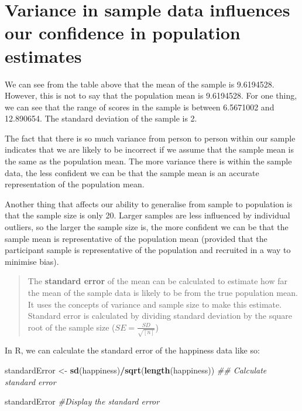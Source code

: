 \documentclass[
]{book}
\newenvironment{Shaded}{\begin{snugshade}}{\end{snugshade}}
\newcommand{\CommentTok}[1]{\textcolor[rgb]{0.56,0.35,0.01}{\textit{#1}}}
\newcommand{\KeywordTok}[1]{\textcolor[rgb]{0.13,0.29,0.53}{\textbf{#1}}}
\newcommand{\NormalTok}[1]{#1}
\newcommand{\OperatorTok}[1]{\textcolor[rgb]{0.81,0.36,0.00}{\textbf{#1}}}
\newcommand{\StringTok}[1]{\textcolor[rgb]{0.31,0.60,0.02}{#1}}
\begin{document}
\hypertarget{variance-in-sample-data-influences-our-confidence-in-population-estimates}{%
\section{Variance in sample data influences our confidence in population estimates}\label{variance-in-sample-data-influences-our-confidence-in-population-estimates}}

We can see from the table above that the mean of the sample is 9.6194528. However, this is not to say that the population mean is 9.6194528. For one thing, we can see that the range of scores in the sample is between 6.5671002 and 12.890654. The standard deviation of the sample is 2.

The fact that there is so much variance from person to person within our sample indicates that we are likely to be incorrect if we assume that the sample mean is the same as the population mean. The more variance there is within the sample data, the less confident we can be that the sample mean is an accurate representation of the population mean.

Another thing that affects our ability to generalise from sample to population is that the sample size is only 20. Larger samples are less influenced by individual outliers, so the larger the sample size is, the more confident we can be that the sample mean is representative of the population mean (provided that the participant sample is representative of the population and recruited in a way to minimise bias).

\begin{quote}
The \textbf{standard error} of the mean can be calculated to estimate how far the mean of the sample data is likely to be from the true population mean. It uses the concepts of variance and sample size to make this estimate. Standard error is calculated by dividing standard deviation by the square root of the sample size (\(SE = \frac{SD}{\sqrt{\left[n\right]}}\))
\end{quote}

In R, we can calculate the standard error of the happiness data like so:

\begin{Shaded}
\begin{Highlighting}[]
\NormalTok{ standardError <-}\StringTok{ }\KeywordTok{sd}\NormalTok{(happiness)}\OperatorTok{/}\KeywordTok{sqrt}\NormalTok{(}\KeywordTok{length}\NormalTok{(happiness)) }\CommentTok{## Calculate standard error}

\NormalTok{standardError }\CommentTok{#Display the standard error}
\end{Highlighting}
\end{Shaded}
\end{document}
